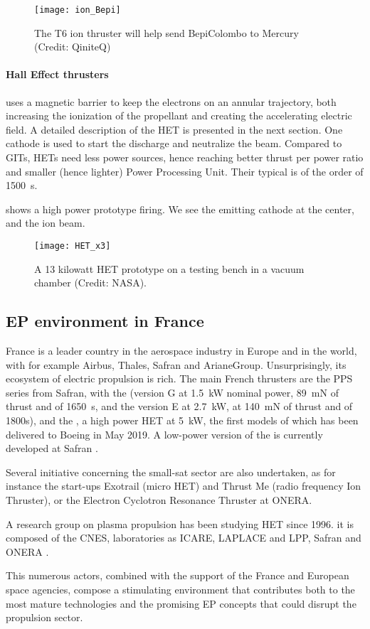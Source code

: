 \begin{figure}[hbtp]
  \centering
  \texttt{[image: ion\_Bepi]}
  \caption{The T6 ion thruster will help send BepiColombo to Mercury (Credit: QiniteQ)}
  \label{fig-iongridded}
\end{figure}
 
 \paragraph{Hall Effect thrusters} uses a magnetic barrier to keep the electrons on an annular trajectory, both increasing the ionization of the propellant and creating the accelerating electric field.
 A detailed description of the \ac{HET} is presented in the next section.
 One cathode is used to start the discharge and neutralize the beam.
 Compared to GITs, HETs need less power sources, hence reaching better thrust per power ratio and smaller (hence lighter) Power Processing Unit.
 Their typical \Isp is of the order of 1500~s.
 
  shows a high power prototype firing.
 We see the emitting cathode at the center, and the ion beam.
 \begin{figure}[hbtp]
   \centering
   \texttt{[image: HET\_x3]}
   \caption{A 13 kilowatt \ac{HET} prototype on a testing bench in a vacuum chamber (Credit: NASA).  }
   \label{fig-13kWHET}
 \end{figure}
 
 
 \subsection*{\ac{EP} environment in France} \label{subsec-HET_thruster}
 
 France is a leader country in the aerospace industry in Europe and in the world, with for example Airbus, Thales, Safran and ArianeGroup.
 Unsurprisingly, its ecosystem of electric propulsion is rich.
 The main French thrusters are the PPS series from Safran, with the  (version G at 1.5~kW nominal power, 89~mN of thrust and \Isp of 1650~s, and the version E at 2.7~kW, at 140~mN of thrust and \Isp of 1800s), and the , a high power \ac{HET} at 5~kW, the first models of which has been delivered to Boeing in May 2019.
 A low-power version of the \PPS{}  is currently developed at Safran \citep{vaudolon2018}.

 
 Several initiative concerning the small-sat sector are also undertaken, as for instance the start-ups Exotrail (micro \ac{HET}) and Thrust Me (radio frequency Ion Thruster), or the Electron Cyclotron Resonance Thruster at ONERA.
 
 A research group on plasma propulsion has been studying \ac{HET} since 1996.
 it is composed of the \ac{CNES}, laboratories as ICARE, LAPLACE and LPP, Safran and ONERA \citep{boniface2017}.
 
 This numerous actors, combined with the support of the France and European space agencies, compose a stimulating environment that contributes both to the most mature technologies and the promising \ac{EP} concepts that could disrupt the propulsion sector.
 